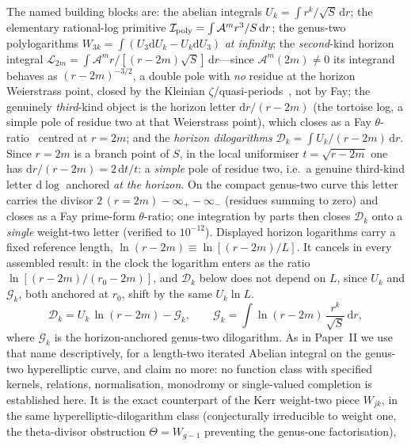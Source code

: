 \documentclass[12pt]{iopart}
\newcommand{\dd}{\mathrm{d}}
\theoremstyle{plain}
\theoremstyle{definition}
\theoremstyle{plain}
\theoremstyle{remark}
\begin{document}
The named building blocks are: the abelian integrals $U_k=\int r^k/\sqrt S\,\dd r$;
the elementary rational-log primitive
$\mathcal{I}_{\rm poly}=\int\mathcal{A}^m r^3/S\,\dd r$; the genus-two
polylogarithms $W_{3k}=\int(U_3\dd U_k-U_k\dd U_3)$ \emph{at infinity};
the \emph{second}-kind horizon integral
$\mathcal{L}_{2m}=\int\mathcal{A}^m r/[(r-2m)\sqrt S]\,\dd r$---since
$\mathcal{A}^m(2m)\ne0$ its integrand behaves as $(r-2m)^{-3/2}$, a double pole with
\emph{no} residue at the horizon Weierstrass point, closed by the Kleinian
$\zeta$/quasi-periods~\cite{BuchstaberEnolskii1997,BakerAbelian1897}, not by Fay; the
genuinely \emph{third}-kind object is the horizon letter $\dd r/(r-2m)$ (the tortoise
log, a simple pole of residue two at that Weierstrass point), which closes as a Fay
$\theta$-ratio~\cite{Fay1973} centred at $r=2m$; and
the \emph{horizon dilogarithms} $\mathcal{D}_k=\int U_k/(r-2m)\,\dd r$. Since $r=2m$
is a branch point of $S$, in the local uniformiser $t=\sqrt{r-2m}$ one has
$\dd r/(r-2m)=2\,\dd t/t$: a \emph{simple} pole of residue two, i.e.\ a genuine
third-kind letter $\dd\log$ anchored \emph{at the horizon}. On the compact
genus-two curve this letter carries the divisor $2\,(r{=}2m)-\infty_+-\infty_-$ (residues
summing to zero) and closes as a Fay prime-form $\theta$-ratio; one integration by parts
then closes $\mathcal{D}_k$ onto a \emph{single} weight-two letter (verified to
$10^{-12}$). Displayed horizon logarithms carry a fixed reference length,
$\ln(r-2m)\equiv\ln[(r-2m)/L]$. It cancels in every assembled result: in the clock the
logarithm enters as the ratio $\ln[(r-2m)/(r_0-2m)]$, and $\mathcal{D}_k$ below does not
depend on $L$, since $U_k$ and $\mathcal{G}_k$, both anchored at $r_0$, shift by the same
$U_k\ln L$.
\begin{equation}
    \mathcal{D}_k=U_k\,\ln(r-2m)-\mathcal{G}_k,\qquad
    \mathcal{G}_k=\int\ln(r-2m)\,\frac{r^k}{\sqrt S}\,\dd r,
    \label{eq:horizon-dilog}
\end{equation}
where $\mathcal{G}_k$ is the horizon-anchored genus-two dilogarithm. As in Paper~II we
use that name descriptively, for a length-two iterated Abelian integral on the
genus-two hyperelliptic curve, and claim no more: no function class with specified
kernels, relations, normalisation, monodromy or single-valued completion is
established here. It is the exact
counterpart of the Kerr weight-two piece $W_{jk}$, in the same
hyperelliptic-dilogarithm class (conjecturally irreducible to weight one, the
theta-divisor obstruction $\Theta=W_{g-1}$ preventing the genus-one factorisation),
\end{document}
